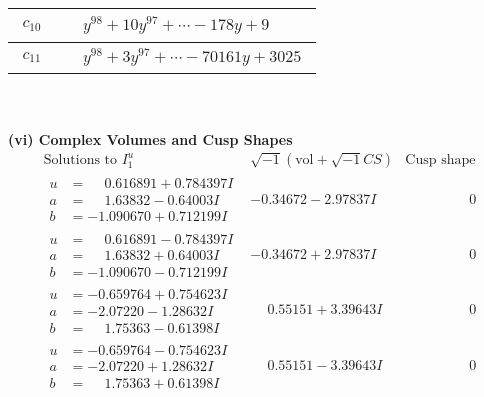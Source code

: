 \documentclass[1p]{elsarticle_modified}
\theoremstyle{definition}
\newcommand{\I}{\sqrt{-1}}
\begin{document}
\begin{tabular}{m{50pt}|m{274pt}}
\hline $$\begin{aligned}c_{10}\end{aligned}$$&$\begin{aligned}
&y^{98}+10 y^{97}+\cdots-178 y+9
\end{aligned}$\\
\hline $$\begin{aligned}c_{11}\end{aligned}$$&$\begin{aligned}
&y^{98}+3 y^{97}+\cdots-70161 y+3025
\end{aligned}$\\
\hline
\end{tabular}\\~\\
\newpage\flushleft \textbf{(vi) Complex Volumes and Cusp Shapes}
$$\begin{array}{c|c|c}  
\text{Solutions to }I^u_{1}& \I (\text{vol} + \sqrt{-1}CS) & \text{Cusp shape}\\
 \hline 
\begin{aligned}
u &= \phantom{-}0.616891 + 0.784397 I \\
a &= \phantom{-}1.63832 - 0.64003 I \\
b &= -1.090670 + 0.712199 I\end{aligned}
 & -0.34672 - 2.97837 I & \phantom{-0.000000 } 0 \\ \hline\begin{aligned}
u &= \phantom{-}0.616891 - 0.784397 I \\
a &= \phantom{-}1.63832 + 0.64003 I \\
b &= -1.090670 - 0.712199 I\end{aligned}
 & -0.34672 + 2.97837 I & \phantom{-0.000000 } 0 \\ \hline\begin{aligned}
u &= -0.659764 + 0.754623 I \\
a &= -2.07220 - 1.28632 I \\
b &= \phantom{-}1.75363 - 0.61398 I\end{aligned}
 & \phantom{-}0.55151 + 3.39643 I & \phantom{-0.000000 } 0 \\ \hline\begin{aligned}
u &= -0.659764 - 0.754623 I \\
a &= -2.07220 + 1.28632 I \\
b &= \phantom{-}1.75363 + 0.61398 I\end{aligned}
 & \phantom{-}0.55151 - 3.39643 I & \phantom{-0.000000 } 0 \\ \hline\begin{aligned}

\end{aligned}
\end{array}$$
\end{document}
